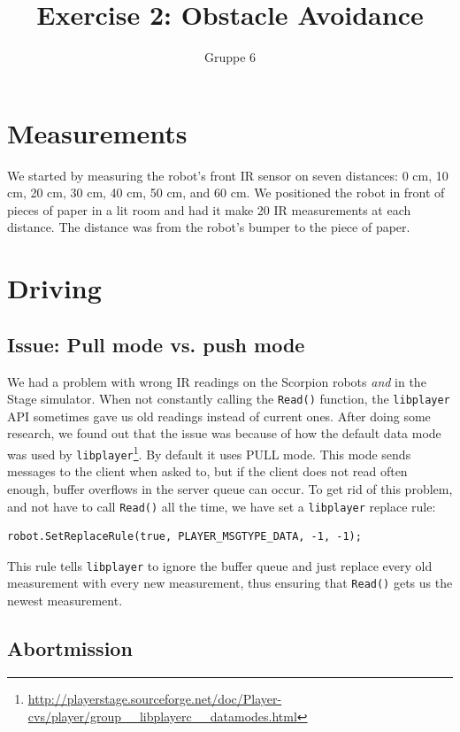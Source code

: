 \documentclass[a4paper,12pt]{article}
\title{Exercise 2: Obstacle Avoidance}
\author{Gruppe 6}
\begin{document}
\maketitle

\section{Measurements}

We started by measuring the robot's front IR sensor on seven distances: 0 cm, 10
cm, 20 cm, 30 cm, 40 cm, 50 cm, and 60 cm.  We positioned the robot in front of
pieces of paper in a lit room and had it make 20 IR measurements at each
distance.  The distance was from the robot's bumper to the piece of paper.


\section{Driving}

\subsection{Issue: Pull mode vs. push mode}

We had a problem with wrong IR readings on the Scorpion robots \emph{and} in the
Stage simulator.  When not constantly calling the \texttt{Read()} function, the
\texttt{libplayer} API sometimes gave us old readings instead of current ones.
After doing some research, we found out that the issue was because of how the
default data mode was used by
\texttt{libplayer}\footnote{\url{http://playerstage.sourceforge.net/doc/Player-cvs/player/group__libplayerc__datamodes.html}}.
By default it uses PULL mode.  This mode sends messages to the client when asked
to, but if the client does not read often enough, buffer overflows in the server
queue can occur.  To get rid of this problem, and not have to call
\texttt{Read()} all the time, we have set a \texttt{libplayer} replace rule:

\begin{verbatim}
robot.SetReplaceRule(true, PLAYER_MSGTYPE_DATA, -1, -1);
\end{verbatim}

This rule tells \texttt{libplayer} to ignore the buffer queue and just replace
every old measurement with every new measurement, thus ensuring that
\texttt{Read()} gets us the newest measurement.


\subsection{Abortmission}
\end{document}
